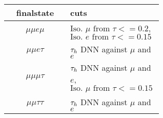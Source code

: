 \begin{table}[h!tbp]
\centering
{}
\begin{tabular*}{0.8\textwidth}{c|p{0.6\linewidth}}
\hline
finalstate          & cuts \\\hline 
$\mu\mu e \mu$    &    $\text{Iso. $\mu$ from $\tau$} <= 0.2$, $\text{Iso. $e$ from $\tau$} <= 0.15$       \\\hline
$\mu\mu e \tau$   &   $\tau_h$ DNN against $\mu$ and $e$        \\\hline
$\mu\mu\mu\tau$   &   $\tau_h$ DNN against $\mu$ and $e$,$\text{Iso. $\mu$ from $\tau$} <= 0.15$        \\\hline
$\mu\mu\tau\tau$  &   $\tau_h$ DNN against $\mu$ and $e$       \\\hline
\end{tabular*}
\end{table}






%
%
%
%
%

